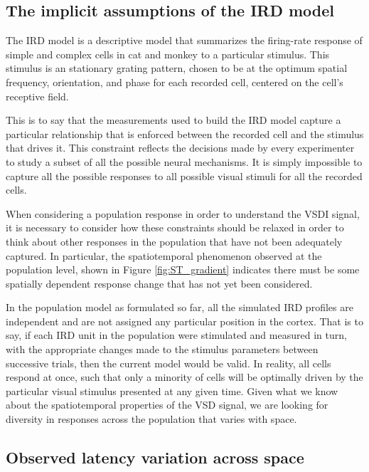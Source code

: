 \documentclass[phd,ianc,twoside]{infthesis}
\begin{document}
\subsection{The implicit assumptions of the IRD model}

The IRD model is a descriptive model that summarizes the firing-rate
response of simple and complex cells in cat and monkey to a particular
stimulus. This stimulus is an stationary grating pattern, chosen to be
at the optimum spatial frequency, orientation, and phase for each
recorded cell, centered on the cell's receptive field.

This is to say that the measurements used to build the IRD model capture
a particular relationship that is enforced between the recorded cell and
the stimulus that drives it. This constraint reflects the decisions made
by every experimenter to study a subset of all the possible
neural mechanisms. It is simply impossible to capture all the possible responses to
all possible visual stimuli for all the recorded cells.

When considering a population response in order to understand the VSDI
signal, it is necessary to consider how these constraints should be
relaxed in order to think about other responses in the population that
have not been adequately captured. In particular, the spatiotemporal
phenomenon observed at the population level, shown in Figure
\ref{fig:ST_gradient} indicates there must be some spatially dependent
response change that has not yet been considered.

In the population model as formulated so far, all the simulated IRD
profiles are independent and are not
assigned any particular position in the cortex. That is to say, if each
IRD unit in the population were stimulated and measured in turn, with
the appropriate changes made to the stimulus parameters between
successive trials, then the current model would be valid. In reality,
all cells respond at once, such that only a minority of cells will be
optimally driven by the particular visual stimulus presented at any
given time. Given what we know about the spatiotemporal properties of
the VSD signal, we are looking for diversity in responses across the
population that varies with space.

\subsection{Observed latency variation across space}
\label{section:non_optimal_spatial}
\end{document}
